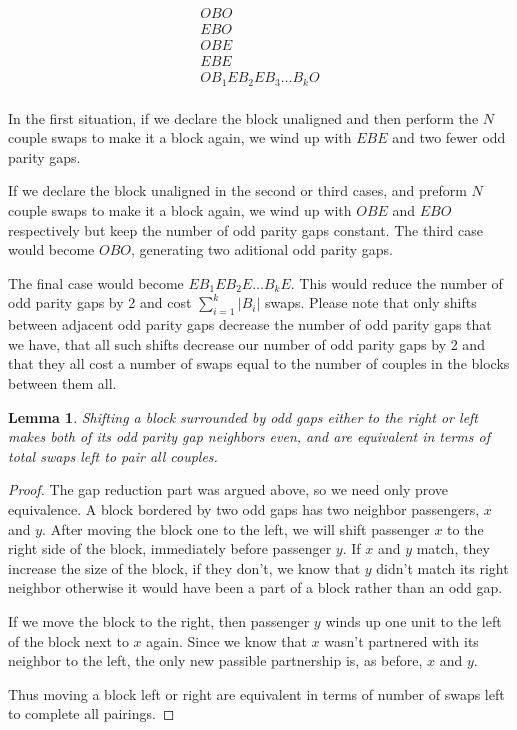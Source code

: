 \documentclass[a4paper]{article}
\newtheorem{lem}{Lemma}[section]
\begin{document}
\begin{align*}
O B O \\
E B O \\
O B E \\
E B E \\
O B_1 E B_2 E B_3 \hdots B_k O \\
\end{align*}

In the first situation, if we declare the block unaligned and then perform the $N$ couple swaps to make it a block again, we wind up with $E B E$ and two fewer odd parity gaps.  

If we declare the block unaligned in the second or third cases, and preform $N$ couple swaps to make it a block again, we wind up with $O B E $ and $E B O$ respectively but keep the number of odd parity gaps constant.  The third case would become $O B O$, generating two aditional odd parity gaps.

The final case would become $E B_1 E B_2 E \hdots B_k E$.  This would reduce the number of odd parity gaps by 2 and cost $\sum_{i=1}^k |B_i|$ swaps.  Please note that only shifts between adjacent odd parity gaps decrease the number of odd parity gaps that we have, that all such shifts decrease our number of odd parity gaps by 2 and that they all cost a number of swaps equal to the number of couples in the blocks between them all.

\begin{lem} \label{lem:shiftLeftRightIdentical}
Shifting a block surrounded by odd gaps either to the right or left makes both of its odd parity gap neighbors even, and are equivalent in terms of total swaps left to pair all couples.
\end{lem}

\begin{proof}
The gap reduction part was argued above, so we need only prove equivalence.  A block bordered by two odd gaps has two neighbor passengers, $x$ and $y$.  After moving the block one to the left, we will shift passenger $x$ to the right side of the block, immediately before passenger $y$.  If $x$ and $y$ match, they increase the size of the block, if they don't, we know that $y$ didn't match its right neighbor otherwise it would have been a part of a block rather than an odd gap.

If we move the block to the right, then passenger $y$ winds up one unit to the left of the block next to $x$ again. Since we know that $x$ wasn't partnered with its neighbor to the left, the only new passible partnership is, as before, $x$ and $y$.

Thus moving a block left or right are equivalent in terms of number of swaps left to complete all pairings.
\end{proof}
\end{document}
